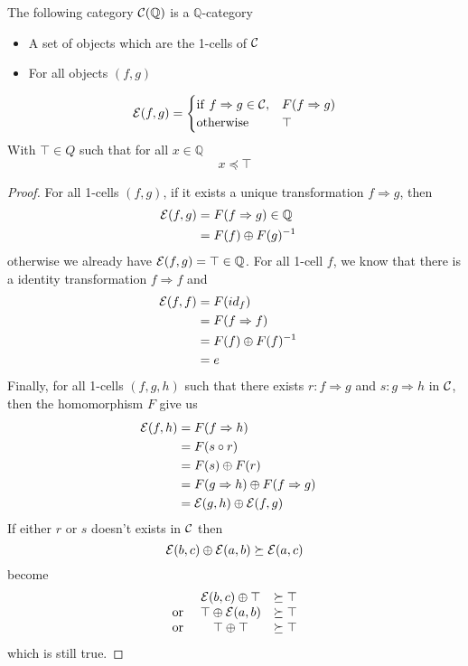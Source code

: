 \documentclass[a4paper]{article}
\begin{document}
\begin{proposition}
The following category ${\cal C}(\mathbb{Q})$ is a $\mathbb{Q}$-category
\begin{itemize}
\item A set of objects which are the 1-cells of ${\cal C}$
\item For all objects $(f, g)$
\end{itemize}
\[
{\cal E}(f, g) = \begin{cases} {\rm if~} f \Rightarrow g \in {\cal C}, &F(f \Rightarrow g) \cr {\rm otherwise~} &\top \end{cases}
\]
With $\top \in Q$ such that for all $x \in \mathbb{Q}$
\[
x \preceq \top
\]

\begin{proof}
For all 1-cells $(f, g)$, if it exists a unique transformation $f \Rightarrow g$, then
\begin{align}
{\cal E}(f, g) &= F(f \Rightarrow g) \in \mathbb{Q} \cr
&= F(f) \oplus F(g)^{-1}
\end{align}
otherwise we already have ${\cal E}(f, g) = \top \in \mathbb{Q}$.
For all 1-cell $f$, we know that there is a identity transformation $f \Rightarrow f$ and
\begin{align}
{\cal E}(f, f) &= F(id_f) \cr
&= F(f \Rightarrow f)\cr
&= F(f) \oplus F(f)^{-1} \cr
&= e
\end{align}
Finally, for all 1-cells $(f, g, h)$ such that there exists $r: f \Rightarrow g$ and $s: g \Rightarrow h$ in ${\cal C}$, then the homomorphism $F$ give us
\begin{align}
{\cal E}(f, h) &= F(f \Rightarrow h) \cr
&= F(s\circ r) \cr
&= F(s) \oplus F(r) \cr
&= F(g \Rightarrow h) \oplus F(f \Rightarrow g) \cr
&= {\cal E}(g, h) \oplus {\cal E}(f, g)
\end{align}
If either $r$ or $s$ doesn't exists in ${\cal C}$ then
\[
{\cal E}(b, c) \oplus {\cal E}(a, b) \succeq {\cal E}(a, c)
\]
become
\[\begin{matrix}
&{\cal E}(b, c) \oplus \top &\succeq \top \cr
{\rm or~} &\top \oplus {\cal E}(a, b) &\succeq \top \cr
{\rm or~} &\top \oplus \top &\succeq \top
\end{matrix}\]
which is still true.
\end{proof}
\end{proposition}
\end{document}
